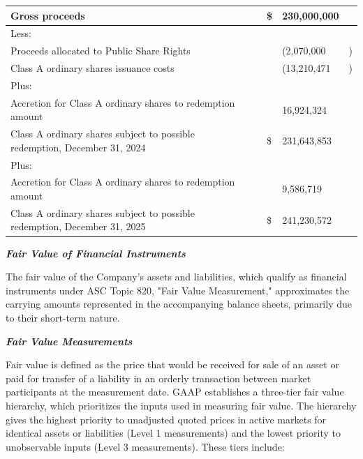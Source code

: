 \documentclass[11pt,a4paper]{article}
\begin{document}
\begin{table}[h]
\begin{tabular}{|l|l|l|l|l|}
\hline
Gross proceeds &  & \$ & 230,000,000 &  \\ \hline
Less: &  &  &  &  \\ \hline
Proceeds allocated to Public Share Rights &  &  & (2,070,000 & ) \\ \hline
Class A ordinary shares issuance costs &  &  & (13,210,471 & ) \\ \hline
Plus: &  &  &  &  \\ \hline
Accretion for Class A ordinary shares to redemption amount &  &  & 16,924,324 &  \\ \hline
Class A ordinary shares subject to possible redemption, December 31, 2024 &  & \$ & 231,643,853 &  \\ \hline
Plus: &  &  &  &  \\ \hline
Accretion for Class A ordinary shares to redemption amount &  &  & 9,586,719 &  \\ \hline
Class A ordinary shares subject to possible redemption, December 31, 2025 &  & \$ & 241,230,572 &  \\ \hline
\end{tabular}
\end{table}

\textit{\textbf{Fair Value of Financial Instruments}}

The fair value of the Company's assets and liabilities, which qualify as financial instruments under ASC Topic 820, "Fair Value Measurement," approximates the carrying amounts represented in the accompanying balance sheets, primarily due to their short-term nature.

\textit{\textbf{Fair Value Measurements}}

Fair value is defined as the price that would be received for sale of an asset or paid for transfer of a liability in an orderly transaction between market participants at the measurement date. GAAP establishes a three-tier fair value hierarchy, which prioritizes the inputs used in measuring fair value. The hierarchy gives the highest priority to unadjusted quoted prices in active markets for identical assets or liabilities (Level 1 measurements) and the lowest priority to unobservable inputs (Level 3 measurements). These tiers include:
\end{document}
